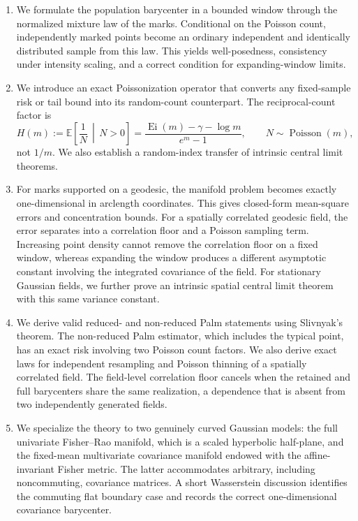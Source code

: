\documentclass[11pt,a4paper]{article}
\theoremstyle{remark}
\newcommand{\EE}{\mathbb E}
\begin{document}
\begin{enumerate}[label=\textbf{C\arabic*.},leftmargin=2.2em]
\item We formulate the population barycenter in a bounded window through the normalized mixture law of the marks.  Conditional on the Poisson count, independently marked points become an ordinary independent and identically distributed sample from this law.  This yields well-posedness, consistency under intensity scaling, and a correct condition for expanding-window limits.

\item We introduce an exact Poissonization operator that converts any fixed-sample risk or tail bound into its random-count counterpart.  The reciprocal-count factor is
\[
H(m):=\EE\!\left[\frac{1}{N}\,\middle|\,N>0\right]
=\frac{\operatorname{Ei}(m)-\gamma-\log m}{e^m-1},
\qquad N\sim\operatorname{Poisson}(m),
\]
not \(1/m\).  We also establish a random-index transfer of intrinsic central limit theorems.

\item For marks supported on a geodesic, the manifold problem becomes exactly one-dimensional in arclength coordinates.  This gives closed-form mean-square errors and concentration bounds.  For a spatially correlated geodesic field, the error separates into a correlation floor and a Poisson sampling term.  Increasing point density cannot remove the correlation floor on a fixed window, whereas expanding the window produces a different asymptotic constant involving the integrated covariance of the field.  For stationary Gaussian fields, we further prove an intrinsic spatial central limit theorem with this same variance constant.

\item We derive valid reduced- and non-reduced Palm statements using Slivnyak's theorem.  The non-reduced Palm estimator, which includes the typical point, has an exact risk involving two Poisson count factors.  We also derive exact laws for independent resampling and Poisson thinning of a spatially correlated field.  The field-level correlation floor cancels when the retained and full barycenters share the same realization, a dependence that is absent from two independently generated fields.

\item We specialize the theory to two genuinely curved Gaussian models: the full univariate Fisher--Rao manifold, which is a scaled hyperbolic half-plane, and the fixed-mean multivariate covariance manifold endowed with the affine-invariant Fisher metric.  The latter accommodates arbitrary, including noncommuting, covariance matrices.  A short Wasserstein discussion identifies the commuting flat boundary case and records the correct one-dimensional covariance barycenter.
\end{enumerate}
\end{document}
